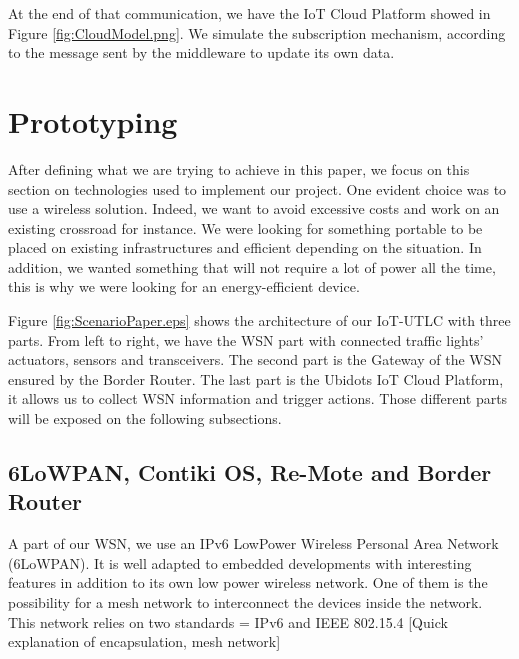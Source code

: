 At the end of that communication,
	we have the IoT Cloud Platform showed in Figure \ref{fig:CloudModel.png}.
We simulate the subscription mechanism,
	according to the message sent by the middleware to update its own data.


\section{Prototyping} \label{sec:Prototyping}

After defining what we are trying to achieve in this paper,
	we focus on this section on technologies used to implement our project.
One evident choice was to use a wireless solution.
Indeed,
	we want to avoid excessive costs and work on an existing crossroad for instance.
We were looking for something portable to be placed on existing infrastructures and efficient depending on the situation.
In addition,
	we wanted something that will not require a lot of power all the time,
	this is why we were looking for an energy-efficient device.

Figure \ref{fig:ScenarioPaper.eps} shows the architecture of our IoT-UTLC with three parts.
From left to right,
	we have the WSN part with connected traffic lights’ actuators,
	sensors and transceivers.
The second part is the Gateway of the WSN ensured by the Border Router.
The last part is the Ubidots IoT Cloud Platform,
	it allows us to collect WSN information and trigger actions.
Those different parts will be exposed on the following subsections.

\subsection{6LoWPAN,
	Contiki OS,
	Re-Mote and Border Router} \label{Sec:Contiki}

A part of our WSN,
	we use an IPv6 LowPower Wireless Personal Area Network (6LoWPAN).
It is well adapted to embedded developments with interesting features in addition to its own low power wireless network.
One of them is the possibility for a mesh network to interconnect the devices inside the network.
This network relies on two standards = IPv6 and IEEE 802.15.4 [Quick explanation of encapsulation,
	mesh network]

